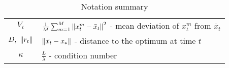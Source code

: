 \begin{table}[htbp]
\begin{tabular}{|c|p{12cm}|}
\( V_t \) & \( \fsumm{m=1}{M} \norm{x^m_t-\bar{x}_t}^2 \) - mean deviation of $x^m_t$ from $\bar{x}_t$\\

\( D,\ \norm{r_t} \) & \( \norm{\bar{x_t} - x_*} \) - distance to the optimum at time $t$ \\

\( \kappa \) & \( \frac{L}{\lambda} \) - condition number \\

\hline

\end{tabular}
\caption{Notation summary}
\label{tab:notation}
\end{table}